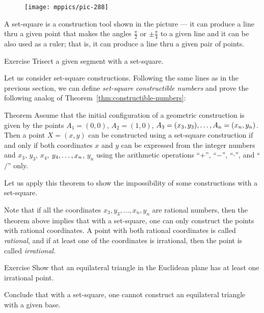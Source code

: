{
\begin{wrapfigure}[5]{r}{26mm}
\vskip-8mm
\centering
\texttt{[image: mppics/pic-288]}
\end{wrapfigure}

A set-square is a construction tool shown in the picture ---
it can produce a line thru a given point
that makes the angles
$\tfrac\pi2$ or $\pm\tfrac\pi4$ 
to a given line and it can be also used as a ruler;
that is, it can produce a line thru a given pair of points.

\begin{thm}{Exercise}\label{ex:trisect-set-square}
Trisect a given segment with a set-square.
\end{thm}


Let us consider set-square constructions.
Following the same lines as in the previous section, we can define {}\emph{set-square constructible numbers}
and prove the following analog of Theorem~\ref{thm:constructible-numbers}:

}

\begin{thm}{Theorem}
Assume that the initial configuration of a geometric construction is given by the points $A_1=(0,0)$, $A_2=(1,0)$, $A_3\z=(x_3,y_3),\z\dots,A_n=(x_n,y_n)$.
Then a point $X=(x,y)$ can be constructed using a set-square construction
if and only if both coordinates $x$ and $y$ can be expressed from the integer numbers and $x_3$, $y_3$, $x_4$, $y_4,\z\dots,x_n$, $y_n$ using the arithmetic operations ``$+$'', ``$-$'', ``$\cdot$'', and ``$/$'' only. 
\end{thm}
 
Let us apply this theorem to show the impossibility of some constructions with a set-square.

Note that if all the coordinates $x_3,y_3,\dots,x_n,y_n$ are rational numbers, then the theorem above implies that with a set-square, one can only construct the points with rational coordinates.
A point with both rational coordinates is called \emph{rational},
and if at least one of the coordinates is irrational, then the point is called \emph{irrational}.

\begin{thm}{Exercise}\label{ex:equilateral triangle}
Show that an equilateral triangle in the Euclidean plane has at least one irrational point.

Conclude that with a set-square, one cannot construct an equilateral triangle with a given base.
\end{thm}

